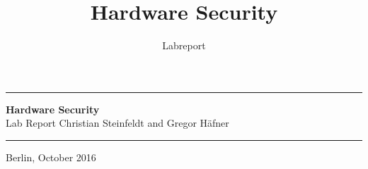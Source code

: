 \documentclass[a4paper, 12pt]{scrartcl}
\title{Hardware Security}
\subtitle{Labreport}
\date{}
\begin{document}
    \begin{titlepage}
        \begin{figure*}
            \begin{flushright}
            \end{flushright}
        \end{figure*}
        \vspace*{-1cm}
        \hrule
        \vspace{.2cm}
        \begin{center}
            \vfill
            \textsf{\textbf{\Huge{Hardware Security}}}\\[1.5em]
            \textsf{\LARGE{Lab Report}}
            \vfill
            Christian Steinfeldt and Gregor Häfner
        \end{center}
        \vfill
        \hrule
        \vspace{.2cm}
        \large{Berlin, October 2016}
    \end{titlepage}
    
    \setcounter{page}{1}
    
    
    
    
    
    \newpage
    
    
    
    
    
    
\end{document}
